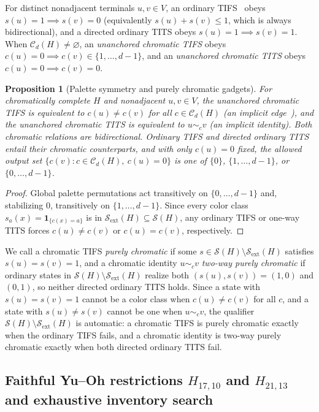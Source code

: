 \documentclass[aps,pra,reprint,superscriptaddress,longbibliography,nofootinbib,floatfix,10pt]{revtex4-2}
\newtheorem{proposition}[theorem]{Proposition}
\theoremstyle{definition}\newtheorem{definition}[theorem]{Definition}
\theoremstyle{remark}\newtheorem{remark}[theorem]{Remark}
\newcommand{\Sc}{\mathcal S}\newcommand{\Cc}{\mathcal C}
\begin{document}
For distinct nonadjacent terminals $u,v\in V$, an ordinary TIFS~\cite{2018-minimalYIYS} obeys $s(u)=1\implies s(v)=0$ (equivalently $s(u)+s(v)\le1$, which is always bidirectional), and a directed ordinary TITS obeys $s(u)=1\implies s(v)=1$. When $\Cc_d(H)\ne\varnothing$, an \emph{unanchored chromatic TIFS} obeys $c(u)=0\implies c(v)\in\{1,\ldots,d-1\}$, and an \emph{unanchored chromatic TITS} obeys $c(u)=0\implies c(v)=0$.

\begin{proposition}[Palette symmetry and purely chromatic gadgets]\label{prop:palette}
For chromatically complete $H$ and nonadjacent $u,v\in V$, the unanchored chromatic TIFS is equivalent to $c(u)\ne c(v)$ for all $c\in\Cc_d(H)$ (an \emph{implicit edge}~\cite[Def.~3.1]{martin2009}), and the unanchored chromatic TITS is equivalent to $u\sim_c v$ (an \emph{implicit identity}). Both chromatic relations are bidirectional. Ordinary TIFS and directed ordinary TITS entail their chromatic counterparts, and with only $c(u)=0$ fixed, the allowed output set $\{c(v):c\in\Cc_d(H),\ c(u)=0\}$ is one of $\{0\}$, $\{1,\ldots,d-1\}$, or $\{0,\ldots,d-1\}$.
\end{proposition}
\begin{proof}
Global palette permutations act transitively on $\{0,\ldots,d-1\}$ and, stabilizing $0$, transitively on $\{1,\ldots,d-1\}$. Since every color class $s_a(x)=\mathbf 1_{\{c(x)=a\}}$ is in $\Sc_{\mathrm{ext}}(H)\subseteq\Sc(H)$, any ordinary TIFS or one-way TITS forces $c(u)\ne c(v)$ or $c(u)=c(v)$, respectively.
\end{proof}

We call a chromatic TIFS \emph{purely chromatic} if some $s\in\Sc(H)\setminus\Sc_{\mathrm{ext}}(H)$ satisfies $s(u)=s(v)=1$, and a chromatic identity $u\sim_c v$ \emph{two-way purely chromatic} if ordinary states in $\Sc(H)\setminus\Sc_{\mathrm{ext}}(H)$ realize both $(s(u),s(v))=(1,0)$ and $(0,1)$, so neither directed ordinary TITS holds. Since a state with $s(u)=s(v)=1$ cannot be a color class when $c(u)\ne c(v)$ for all $c$, and a state with $s(u)\ne s(v)$ cannot be one when $u\sim_c v$, the qualifier $\Sc(H)\setminus\Sc_{\mathrm{ext}}(H)$ is automatic: a chromatic TIFS is purely chromatic exactly when the ordinary TIFS fails, and a chromatic identity is two-way purely chromatic exactly when both directed ordinary TITS fail.

\subsection{Faithful Yu--Oh restrictions \texorpdfstring{$H_{17,10}$ and $H_{21,13}$}{H17,10 and H21,13} and exhaustive inventory search}
\end{document}
